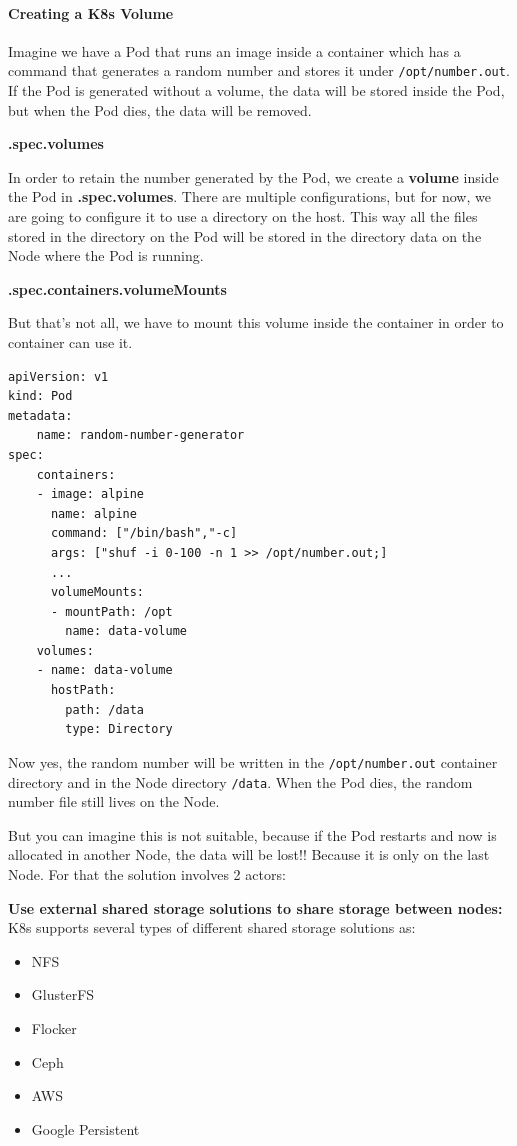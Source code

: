 \documentclass{article}
\newenvironment{codetemplate}[1][]{%
  \mybasecolorbox[#1]
  \itshape
}{%
  \endmybasecolorbox
}
\begin{document}
\paragraph{Creating a K8s Volume}

Imagine we have a Pod that runs an image inside a container which has a command that generates a random number and stores it under \verb|/opt/number.out|. If the Pod is generated without a volume, the data will be stored inside the Pod, but when the Pod dies, the data will be removed.

\textbf{.spec.volumes}

In order to retain the number generated by the Pod, we create a \textbf{volume} inside the Pod in  \textbf{.spec.volumes}. There are multiple configurations, but for now, we are going to configure it to use a directory on the host. This way all the files stored in the directory on the Pod will be stored in the directory data on the Node where the Pod is running.

\textbf{.spec.containers.volumeMounts}

But that's not all,  we have to mount this volume inside the container in order to container can use it.

\begin{codetemplate}{}
\begin{verbatim}
apiVersion: v1
kind: Pod
metadata:
    name: random-number-generator
spec:
    containers:
    - image: alpine
      name: alpine
      command: ["/bin/bash","-c]
      args: ["shuf -i 0-100 -n 1 >> /opt/number.out;]
      ...
      volumeMounts:
      - mountPath: /opt
        name: data-volume
    volumes:
    - name: data-volume
      hostPath:
        path: /data
        type: Directory
\end{verbatim}
\end{codetemplate}

Now yes, the random number will be written in the \verb|/opt/number.out| container directory and in the Node directory \verb|/data|. When the Pod dies, the random number file still lives on the Node.

But you can imagine this is not suitable, because if the Pod restarts and now is allocated in another Node, the data will be lost!! Because it is only on the last Node. For that the solution involves 2 actors:

\textbf{Use external shared storage solutions to share storage between nodes:} K8s supports several types of different shared storage solutions as:
\begin{itemize}
    \item NFS
    \item GlusterFS
    \item Flocker
    \item Ceph
    \item AWS
    \item Google Persistent
\end{itemize}
\end{document}

